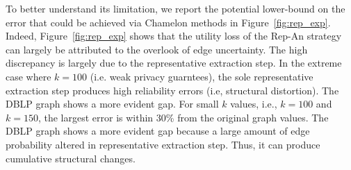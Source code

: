 To better understand its limitation, we report the potential lower-bound on the error that could be achieved via Chamelon methods in Figure~\ref{fig:rep_exp}. Indeed, Figure~\ref{fig:rep_exp} shows that the utility loss of the Rep-An strategy can largely be attributed to the overlook of edge uncertainty. 
The high discrepancy is largely due to the representative extraction step. In the extreme case where $k=100$ (i.e. weak privacy guarntees), the sole representative extraction step produces high reliability errors (i.e, structural distortion). 
The \textsc{DBLP} graph shows a more evident gap. For small $k$ values, i.e., $k=100$ and $k=150$, the largest error is within 30\% from the original graph values. The \textsc{DBLP} graph shows a more evident gap because a large amount of edge probability altered in representative extraction step. Thus, it can produce cumulative structural changes. 
  




